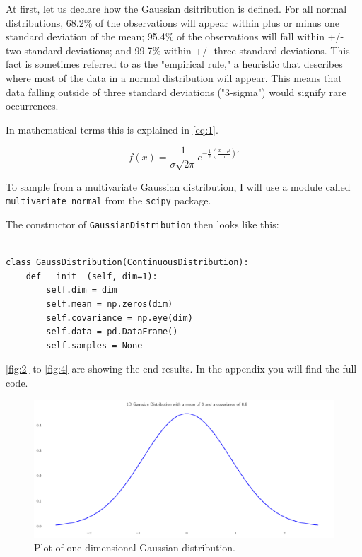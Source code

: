 \documentclass{CPSReport}
\begin{document}
At first, let us declare how the Gaussian dsitribution is defined.
For all normal distributions, 68.2\% of the observations will appear within plus or minus one standard deviation of the mean; 95.4\% of the observations will fall within +/- two standard deviations; and 99.7\% within +/- three standard deviations. This fact is sometimes referred to as the "empirical rule," a heuristic that describes where most of the data in a normal distribution will appear.
This means that data falling outside of three standard deviations ("3-sigma") would signify rare occurrences.

In mathematical terms this is explained in \autoref{eq:1}.

\begin{equation} \label{eq:1}
    f(x)=\frac{1}{\sigma \sqrt{2\pi } } e^{-\frac{1}{2}(\frac{x-\mu}{\sigma})²}
\end{equation}

To sample from a multivariate Gaussian distribution, I will use a module called \texttt{multivariate_normal} from the \texttt{scipy} package.

The constructor of \texttt{GaussianDistribution} then looks like this:

\begin{verbatim}

class GaussDistribution(ContinuousDistribution):
    def __init__(self, dim=1):
        self.dim = dim
        self.mean = np.zeros(dim)
        self.covariance = np.eye(dim)
        self.data = pd.DataFrame()
        self.samples = None
\end{verbatim}

\autoref{fig:2} to \autoref{fig:4} are showing the end results.
In the appendix you will find the full code.

\begin{figure}[ht]
    \begin{center}
        \includegraphics[width=1\linewidth]{../gaussian1D.pdf}
    \end{center}
    \caption{Plot of one dimensional Gaussian distribution.}
    \label{fig:2}
\end{figure}
\end{document}
